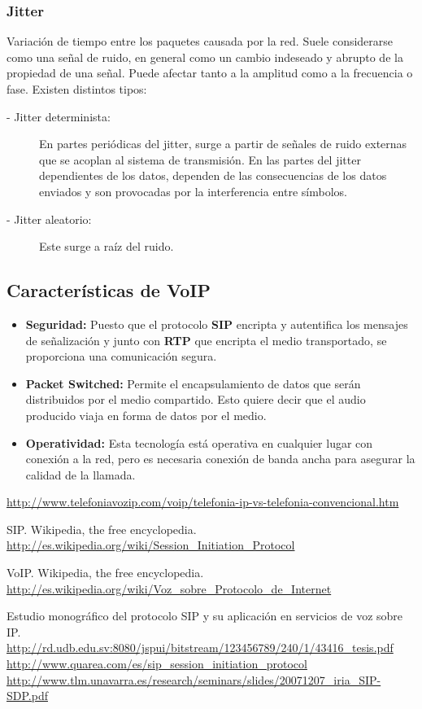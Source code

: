 \documentclass[a4paper, 11pt]{article} %
\begin{document}
		\subsubsection{Jitter} \label{jitter}
			Variación de tiempo entre los paquetes causada por la red. Suele considerarse como una señal de ruido, en general como un cambio indeseado y abrupto de la propiedad de una señal. Puede afectar tanto a la amplitud como a la frecuencia o fase.
			Existen distintos tipos:
			\begin{description}
				\item[- Jitter determinista:] En partes periódicas del jitter, surge a partir de señales de ruido externas que se acoplan al sistema de transmisión. En las partes del jitter dependientes de los datos, dependen de las consecuencias de los datos enviados y son provocadas por la interferencia entre símbolos.
				\item[- Jitter aleatorio:] Este surge a raíz del ruido.
			\end{description}
			
		\subsection{Características de VoIP}
		\begin{itemize}
			\item \textbf{Seguridad:} Puesto que el protocolo \textbf{SIP} encripta y autentifica los mensajes de señalización y junto con \textbf{RTP} que encripta el medio transportado, se proporciona una comunicación segura.
			\item \textbf{Packet Switched:} Permite el encapsulamiento de datos que serán distribuidos por el medio compartido. Esto quiere decir que el audio producido viaja en forma de datos por el medio.
			\item \textbf{Operatividad:} Esta tecnología está operativa en cualquier lugar con conexión a la red, pero es necesaria conexión de banda ancha para asegurar la calidad de la llamada.
		\end{itemize}

\newpage
	\begin{thebibliography}{10}
		\url{http://www.telefoniavozip.com/voip/telefonia-ip-vs-telefonia-convencional.htm}
	
		SIP. Wikipedia, the free encyclopedia.\\
		\url{http://es.wikipedia.org/wiki/Session_Initiation_Protocol}
	
		VoIP. Wikipedia, the free encyclopedia.\\
		\url{http://es.wikipedia.org/wiki/Voz_sobre_Protocolo_de_Internet}
		
		Estudio monográfico del protocolo SIP y su aplicación en servicios de voz sobre IP.\\
		\url{http://rd.udb.edu.sv:8080/jspui/bitstream/123456789/240/1/43416_tesis.pdf}
		\url{http://www.quarea.com/es/sip_session_initiation_protocol}
		\url{http://www.tlm.unavarra.es/research/seminars/slides/20071207_iria_SIP-SDP.pdf}
	\end{thebibliography}
\end{document}
